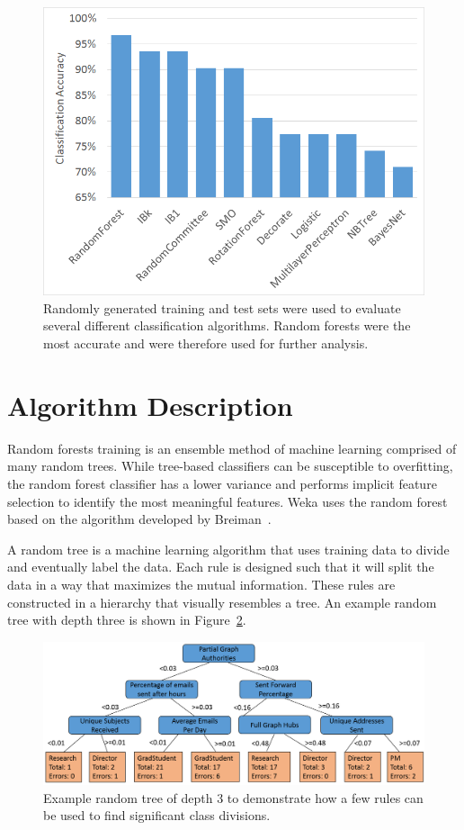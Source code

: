 \documentclass[12pt]{report}
\begin{document}
\begin{figure}[t]
	\centering
	\includegraphics[width=0.8\columnwidth,trim={0mm 0mm 0mm 0mm},clip]{ModelSelection}
	\vspace{-12pt}
	\caption[Algorithm selection analysis]{Randomly generated training and test sets were used to evaluate several different classification algorithms.  Random forests were the most accurate and were therefore used for further analysis.}
	\label{fig:algorithm_selection}
\end{figure}


\section{Algorithm Description} \label{sec:InfoGain}
Random forests training is an ensemble method of machine learning comprised of many random trees.
While tree-based classifiers can be susceptible to overfitting, the random forest classifier has a lower variance and performs implicit feature selection to identify the most meaningful features.  
Weka uses the random forest based on the algorithm developed by Breiman~\cite{Breiman2001}.

A random tree is a machine learning algorithm that uses training data to divide and eventually label the data.
Each rule is designed such that it will split the data in a way that maximizes the mutual information.
These rules are constructed in a hierarchy that visually resembles a tree.
An example random tree with depth three is shown in Figure~\ref{fig:ex_tree}.

\begin{figure}[t]
    \centering
    \includegraphics[width=\columnwidth,trim={0mm 0mm 0mm 0mm},clip]{3_level_tree}
    \vspace{-12pt}
    \caption[Example random tree]{Example random tree of depth 3 to demonstrate how a few rules can be used to find significant class divisions.}
    \label{fig:ex_tree}
\end{figure}
\end{document}
